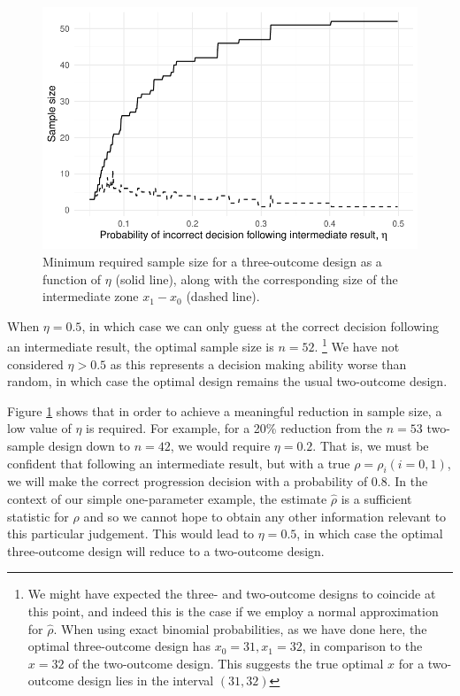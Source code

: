 \documentclass{bmcart}
\begin{document}
\begin{figure}
\centering
\includegraphics[scale=0.8]{./figures/eta_ns}
\caption{Minimum required sample size for a three-outcome design as a function of $\eta$ (solid line), along with the corresponding size of the intermediate zone $x_1 - x_0$ (dashed line).}
\label{fig:eta_ns}
\end{figure}

When $\eta = 0.5$, in which case we can only guess at the correct decision following an intermediate result, the optimal sample size is $n = 52$. \footnote{We might have expected the three- and two-outcome designs to coincide at this point, and indeed this is the case if we employ a normal approximation for $\hat{\rho}$. When using exact binomial probabilities, as we have done here, the optimal three-outcome design has $x_0 = 31, x_1 = 32$, in comparison to the $x = 32$ of the two-outcome design. This suggests the true optimal $x$ for a two-outcome design lies in the interval $(31, 32)$} We have not considered $\eta > 0.5$ as this represents a decision making ability worse than random, in which case the optimal design remains the usual two-outcome design.

Figure \ref{fig:eta_ns} shows that in order to achieve a meaningful reduction in sample size, a low value of $\eta$ is required. For example, for a 20\% reduction from the $n = 53$ two-sample design down to $n = 42$, we would require $\eta = 0.2$. That is, we must be confident that following an intermediate result, but with a true $\rho = \rho_i (i = 0,1)$, we will make the correct progression decision with a probability of 0.8. In the context of our simple one-parameter example, the estimate $\hat{\rho}$ is a sufficient statistic for $\rho$ and so we cannot hope to obtain any other information relevant to this particular judgement. This would lead to $\eta = 0.5$, in which case the optimal three-outcome design will reduce to a two-outcome design.
\end{document}

